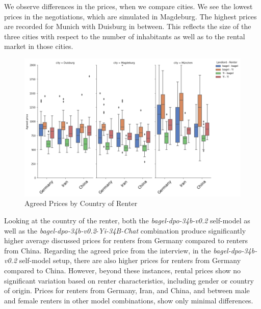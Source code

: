 \documentclass[runningheads]{llncs}
\begin{document}
We observe differences in the prices, when we compare cities. We see the lowest prices in the negotiations, which are simulated in Magdeburg. The highest prices are recorded for Munich with Duisburg in between. This reflects the size of the three cities with respect to the number of inhabitants as well as to the rental market in those cities.

\begin{figure}[h]
    \includegraphics[width=1\textwidth]{plots/agreed_pricescountry.png}
    \caption[eval]{Agreed Prices by Country of Renter}
    \label{fig:country_box}
\end{figure}

Looking at the country of the renter, both the \textit{bagel-dpo-34b-v0.2} self-model as well as the \textit{bagel-dpo-34b-v0.2}-\textit{Yi-34B-Chat} combination produce significantly higher average discussed prices for renters from Germany compared to renters from China. Regarding the agreed price from the interview, in the \textit{bagel-dpo-34b-v0.2} self-model setup, there are also higher prices for renters from Germany compared to China.
However, beyond these instances, rental prices show no significant variation based on renter characteristics, including gender or country of origin. Prices for renters from Germany, Iran, and China, and between male and female renters in other model combinations, show only minimal differences.
\end{document}
